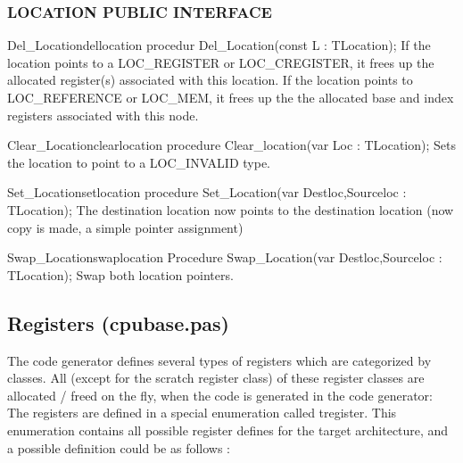 \documentclass [a4paper,12pt]{article}
\begin{document}
\subsubsection{LOCATION PUBLIC INTERFACE}
\label{subsubsec:location}

\begin{procedurel}{Del{\_}Location}{dellocation}
\Declaration
procedur Del{\_}Location(const L : TLocation);
\Description
If the location points to a LOC{\_}REGISTER or LOC{\_}CREGISTER, it frees up
the allocated register(s) associated with this location. If the location
points to LOC{\_}REFERENCE or LOC{\_}MEM, it frees up the the allocated base
and index registers associated with this node.
\end{procedurel}

\begin{procedurel}{Clear{\_}Location}{clearlocation}
\Declaration
procedure Clear{\_}location(var Loc : TLocation);
\Description
Sets the location to point to a LOC{\_}INVALID type.
\end{procedurel}

\begin{procedurel}{Set{\_}Location}{setlocation}
\Declaration
procedure Set{\_}Location(var Destloc,Sourceloc : TLocation);
\Description
The destination location now points to the destination location (now copy is
made, a simple pointer assignment)
\end{procedurel}

\begin{procedurel}{Swap{\_}Location}{swaplocation}
\Declaration
Procedure Swap{\_}Location(var Destloc,Sourceloc : TLocation);
\Description
Swap both location pointers.
\end{procedurel}

\subsection{Registers (cpubase.pas)}
\label{subsec:registers}

The code generator defines several types of registers which are categorized
by classes. All (except for the scratch register class) of these register
classes are allocated / freed on the fly, when the code is generated in the
code generator: The registers are defined in a special enumeration called
tregister. This enumeration contains all possible register defines for the
target architecture, and a possible definition could be as follows :

\end{document}
